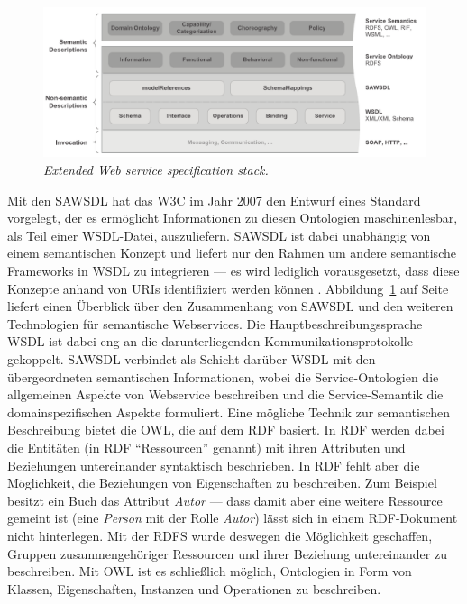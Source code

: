 \begin{figure}[ht]
\centering
\parbox{\textwidth}{
    \includegraphics[width=\textwidth]{media/Extended-Web-Service-Specification-Stack.pdf}
    \caption{\emph{Extended Web service specification stack.} \cite[S.63]{ky-sawsdl}}
    \label{f:ewsss}
}
\end{figure}

\label{l:sawsdl}Mit den \ac{SAWSDL} hat das \ac{W3C} im Jahr 2007 den Entwurf eines Standard vorgelegt, der es ermöglicht Informationen zu diesen Ontologien maschinenlesbar, als Teil einer \ac{WSDL}-Datei, auszuliefern. \ac{SAWSDL} ist dabei unabhängig von einem semantischen Konzept und liefert nur den Rahmen um andere semantische Frameworks in \ac{WSDL} zu integrieren --- es wird lediglich vorausgesetzt, dass diese Konzepte anhand von URIs identifiziert werden können \cite[S.61]{ky-sawsdl}. Abbildung~\ref{f:ewsss} auf Seite~\pageref{f:ewsss} liefert einen Überblick über den Zusammenhang von \ac{SAWSDL} und den weiteren Technologien für semantische Webservices. Die Hauptbeschreibungssprache \ac{WSDL} ist dabei eng an die darunterliegenden Kommunikationsprotokolle gekoppelt. \ac{SAWSDL} verbindet als Schicht darüber \ac{WSDL} mit den übergeordneten semantischen Informationen, wobei die Service-Ontologien die allgemeinen Aspekte von Webservice beschreiben und die Service-Semantik die domainspezifischen Aspekte formuliert. Eine mögliche Technik zur semantischen Beschreibung bietet die \ac{OWL}, die auf dem \ac{RDF} basiert. In \ac{RDF} werden dabei die Entitäten (in \ac{RDF} "`Ressourcen"' genannt) mit ihren Attributen und Beziehungen untereinander syntaktisch beschrieben. In \ac{RDF} fehlt aber die Möglichkeit, die Beziehungen von Eigenschaften zu beschreiben. Zum Beispiel besitzt ein Buch das Attribut \emph{Autor} --- dass damit aber eine weitere Ressource gemeint ist (eine \emph{Person} mit der Rolle \emph{Autor}) lässt sich in einem \ac{RDF}-Dokument nicht hinterlegen. Mit der \ac{RDFS} wurde deswegen die Möglichkeit geschaffen, Gruppen zusammengehöriger Ressourcen und ihrer Beziehung untereinander zu beschreiben. Mit \ac{OWL} ist es schließlich möglich, Ontologien in Form von Klassen, Eigenschaften, Instanzen und Operationen zu beschreiben. 


